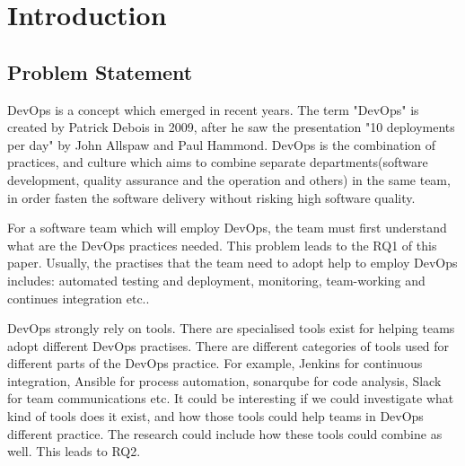 \chapter{Introduction}
\label{chp:introduction}
\section{Problem Statement}
DevOps is a concept which emerged in recent years. The term "DevOps" is created by Patrick Debois in 2009, after he saw the presentation "10 deployments per day" by John Allspaw and Paul Hammond.\cite{kim2016devops} DevOps is the combination of practices, and culture which aims to combine separate departments(software development, quality assurance and the operation and others) in the same team, in order fasten the software delivery without risking high software quality.\cite{DevOpsWi87:online}\cite{ebert2016devops}
\par
For a software team which will employ DevOps, the team must first understand what are the DevOps practices needed. This problem leads to the RQ1 of this paper.
Usually, the practises that the team need to adopt help to employ DevOps includes: automated testing and deployment, monitoring, team-working and continues integration etc.\cite{jabbari2016devops}\cite{zhu2016devops}.
\par
DevOps strongly rely on tools. There are specialised tools exist for helping teams adopt different DevOps practises\cite{zhu2016devops}. There are different categories of tools used for different parts of the DevOps practice. For example, Jenkins for continuous integration, Ansible for process automation, sonarqube for code analysis, Slack for team communications etc. It could be interesting if we could investigate what kind of tools does it exist, and how those tools could help teams in DevOps different practice. The research could include how these tools could combine as well. This leads to RQ2.
\par
